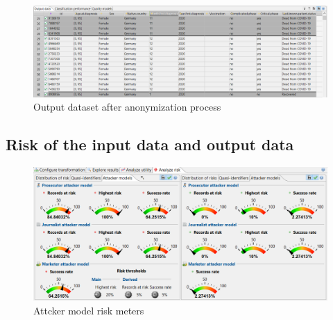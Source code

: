 \begin{figure}[ht]
  \smaller
  \centering
  \includegraphics[width=\textwidth, keepaspectratio]{assets/data_out}
  \caption{Output dataset after anonymization process}
  \label{fig:my_label4}
\end{figure}

\clearpage
\newpage
\subsection{Risk of the input data and output data}

\begin{figure}[ht]
  \smaller
  \centering
  \includegraphics[width=\textwidth, keepaspectratio]{assets/risk_meter}
  \caption{Attcker model risk meters}
  \label{fig:my_label6}
\end{figure}

